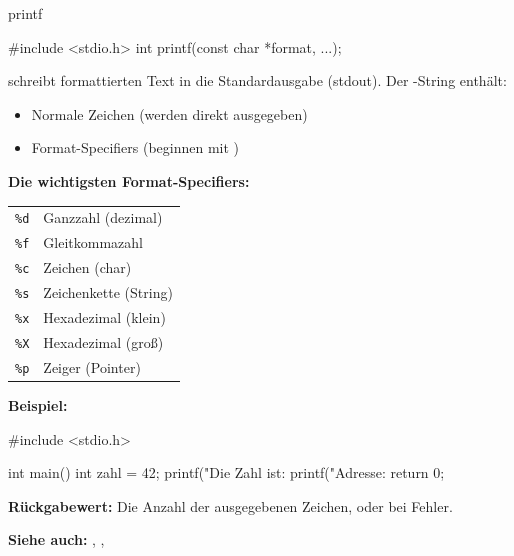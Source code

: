 \begin{man}[stdio]{printf}
    \begin{synopsis}
        \begin{plaincode}[gobble=8]
        #include <stdio.h>
        int printf(const char *format, ...);
        \end{plaincode}
    \end{synopsis}

    \begin{desc}
         schreibt formattierten Text in die Standardausgabe (stdout). Der -String enthält:
        \begin{itemize}
            \item Normale Zeichen (werden direkt ausgegeben)
            \item Format-Specifiers (beginnen mit \codeinline{\%})
        \end{itemize}

        \textbf{Die wichtigsten Format-Specifiers:}

        \begin{tabular}{ll}
        \texttt{\%d} & Ganzzahl (dezimal) \\
        \texttt{\%f} & Gleitkommazahl \\
        \texttt{\%c} & Zeichen (char) \\
        \texttt{\%s} & Zeichenkette (String) \\
        \texttt{\%x} & Hexadezimal (klein) \\
        \texttt{\%X} & Hexadezimal (groß) \\
        \texttt{\%p} & Zeiger (Pointer) \\
        \end{tabular}
    \end{desc}

    \textbf{Beispiel:}
    \begin{code}
    #include <stdio.h>

    int main() {
        int zahl = 42;
        printf("Die Zahl ist: %
        printf("Adresse: %
        return 0;
    }
    \end{code}

    \textbf{Rückgabewert:}
    Die Anzahl der ausgegebenen Zeichen, oder  bei Fehler.

    \textbf{Siehe auch:} , , 
\end{man}

